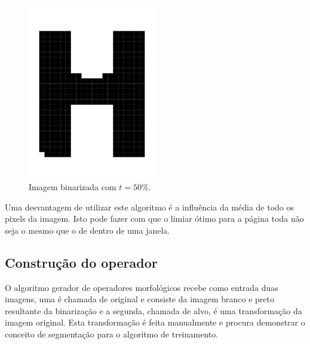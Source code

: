 \documentclass[a4paper,11pt]{article}
\begin{document}
      \begin{figure}[htb]
        \begin{center}
          \includegraphics[width=0.5\textwidth]{assets/binarization/bin_big.png}
          \end{center}
        \caption{Imagem binarizada com $t = 50\%.$}
        \label{fig:letrah_bin}
      \end{figure}

      Uma desvantagem de utilizar este algoritmo é a influência da média de todo os pixels da imagem. Isto pode fazer com que o limiar ótimo para a página toda não seja o mesmo que o de dentro de uma janela.


    \subsection{Construção do operador}

      O algoritmo gerador de operadores morfológicos recebe como entrada duas imagens, uma é chamada de original e consiste da imagem branco e preto resultante da binarização e a segunda, chamada de alvo, é uma transformação da imagem original. Esta transformação é feita manualmente e procura demonstrar o conceito de segmentação para o algoritmo de treinamento.
\end{document}
